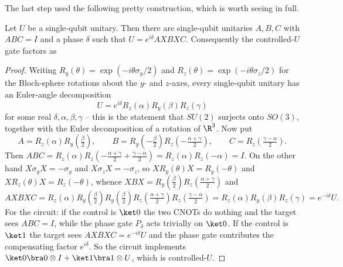 The last step used the following pretty construction, which is worth seeing in full.

\begin{proposition}
	Let $U$ be a single-qubit unitary. Then there are single-qubit unitaries $A,B,C$ with $ABC = I$ and a phase $\delta$ such that $U = e^{i\delta}AXBXC$. Consequently the controlled-$U$ gate factors as
	\begin{center}
	\end{center}
\end{proposition}

\begin{proof}
	Writing $R_y(\theta) = \exp(-i\theta\sigma_y/2)$ and $R_z(\theta) = \exp(-i\theta\sigma_z/2)$ for the Bloch-sphere rotations about the $y$- and $z$-axes, every single-qubit unitary has an Euler-angle decomposition
	$$U = e^{i\delta}R_z(\alpha)R_y(\beta)R_z(\gamma)$$
	for some real $\delta,\alpha,\beta,\gamma$ -- this is the statement that $SU(2)$ surjects onto $SO(3)$, together with the Euler decomposition of a rotation of $\R^3$. Now put
	$$A = R_z(\alpha)R_y\!\left(\tfrac\beta2\right), \qquad B = R_y\!\left(-\tfrac\beta2\right)R_z\!\left(-\tfrac{\alpha+\gamma}{2}\right), \qquad C = R_z\!\left(\tfrac{\gamma-\alpha}{2}\right).$$
	Then $ABC = R_z(\alpha)R_z\!\left(-\tfrac{\alpha+\gamma}2+\tfrac{\gamma-\alpha}2\right) = R_z(\alpha)R_z(-\alpha) = I$. On the other hand $X\sigma_yX = -\sigma_y$ and $X\sigma_zX = -\sigma_z$, so $XR_y(\theta)X = R_y(-\theta)$ and $XR_z(\theta)X = R_z(-\theta)$, whence $XBX = R_y(\tfrac\beta2)R_z(\tfrac{\alpha+\gamma}2)$ and
	$$AXBXC = R_z(\alpha)R_y\!\left(\tfrac\beta2\right)R_y\!\left(\tfrac\beta2\right)R_z\!\left(\tfrac{\alpha+\gamma}2\right)R_z\!\left(\tfrac{\gamma-\alpha}2\right) = R_z(\alpha)R_y(\beta)R_z(\gamma) = e^{-i\delta}U.$$
	For the circuit: if the control is $\ket0$ the two CNOTs do nothing and the target sees $ABC = I$, while the phase gate $P_\delta$ acts trivially on $\ket 0$. If the control is $\ket1$ the target sees $AXBXC = e^{-i\delta}U$ and the phase gate contributes the compensating factor $e^{i\delta}$. So the circuit implements $\ket0\bra0\otimes I + \ket1\bra1\otimes U$, which is controlled-$U$.
\end{proof}

